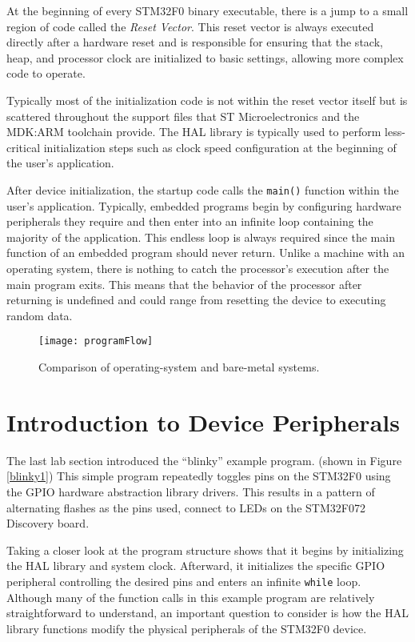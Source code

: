 \documentclass[11pt,fleqn]{book} %
\begin{document}
At the beginning of every STM32F0 binary executable, there is a jump to a small region of code called the \textit{Reset Vector}. This reset vector is always executed directly after a hardware reset and is responsible for ensuring that the stack, heap, and processor clock are initialized to basic settings, allowing more complex code to operate.

Typically most of the initialization code is not within the reset vector itself but is scattered throughout the support files that ST Microelectronics and the MDK:ARM toolchain provide. The HAL library is typically used to perform less-critical initialization steps such as clock speed configuration at the beginning of the user's application. 

After device initialization, the startup code calls the \texttt{main()} function within the user's application. Typically, embedded programs begin by configuring hardware peripherals they require and then enter into an infinite loop containing the majority of the application. This endless loop is always required since the main function of an embedded program should never return. Unlike a machine with an operating system, there is nothing to catch the processor's execution after the main program exits. This means that the behavior of the processor after returning is undefined and could range from resetting the device to executing random data.

\begin{figure}[]
    \centering\texttt{[image: programFlow]}
    \caption{Comparison of operating-system and bare-metal systems. }
    \label{programFlow}
\end{figure}


\section{Introduction to Device Peripherals}

The last lab section introduced the ``blinky'' example program. (shown in Figure \vref{blinky1}) This simple program repeatedly toggles pins on the STM32F0 using the GPIO hardware abstraction library drivers. This results in a pattern of alternating flashes as the pins used, connect to LEDs on the STM32F072 Discovery board. 

Taking a closer look at the program structure shows that it begins by initializing the HAL library and system clock. Afterward, it initializes the specific GPIO peripheral controlling the desired pins and enters an infinite \texttt{while} loop. Although many of the function calls in this example program are relatively straightforward to understand, an important question to consider is how the HAL library functions modify the physical peripherals of the STM32F0 device.
\end{document}
